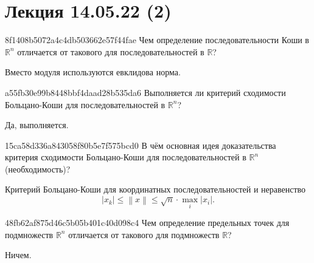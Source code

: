 \section{Лекция 14.05.22 (2)}
\begin{note}{8f1408b5072a4c4db503662e57f44fae}
    Чем определение последовательности Коши в \({ \mathbb R^{n} }\) отличается от такового для последовательностей в  \({ \mathbb R }\)?

    \begin{cloze}{1}
        Вместо модуля используются евклидова норма.
    \end{cloze}
\end{note}

\begin{note}{a55fb30e99b8448bbf4daad28b535da6}
    Выполняется ли критерий сходимости Больцано-Коши для последовательностей в \({ \mathbb R^{n} }\)?

    \begin{cloze}{1}
        Да, выполняется.
    \end{cloze}
\end{note}

\begin{note}{15ca58d336a843058f80b5e7f575bcd0}
    В чём основная идея доказательства критерия сходимости Больцано-Коши для последовательностей в \({ \mathbb R^{n} }\) (необходимость)?

    \begin{cloze}{1}
        Критерий Больцано-Коши для координатных последовательностей и неравенство
        \[
            \left\lvert x_k \right\rvert \leqslant \left\lVert x \right\rVert \leqslant \sqrt{n} \cdot \underset{i}{\max} \left\lvert x_i \right\rvert.
        \]
    \end{cloze}
\end{note}

\begin{note}{48fb62af875d46c5b05b401c40d098c4}
    Чем определение предельных точек для подмножеств \({ \mathbb R^{n} }\) отличается от такового для подмножеств \({ \mathbb R }\)?

    \begin{cloze}{1}
        Ничем.
    \end{cloze}
\end{note}

